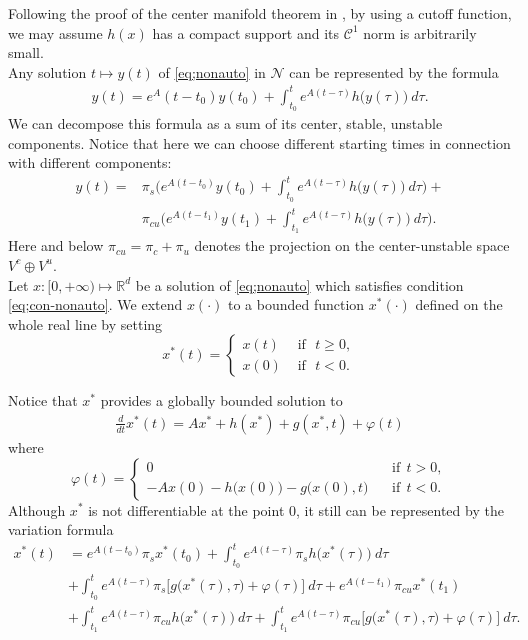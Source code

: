 \documentclass[11pt]{amsart}
\theoremstyle{definition}
\theoremstyle{remark}
\numberwithin{equation}{section}
\begin{document}
Following the proof of the center manifold theorem in \cite{Br03}, by using a cutoff function, we may assume $h(x)$ has a compact support and its $\mathcal{C}^{1}$ norm is arbitrarily small.\\
\indent Any solution $t\mapsto y(t)$ of \eqref{eq;nonauto} in $\mathcal{N}$ can be represented by the formula
\begin{align*}
    y(t)=e^A(t-t_0)y(t_0)+\int^{t}_{t_0}e^{A(t-\tau)}h\big(y(\tau)\big)\ d\tau.
\end{align*}
We can decompose this formula as a sum of its center, stable, unstable components. Notice that here we can choose different starting times in connection with different components:
\begin{equation}
\label{eq;var-decom1}
    \begin{aligned}
        y(t)=&\pi_s\Big(e^{A(t-t_0)}y(t_0)+\int^t_{t_0}e^{A(t-\tau)}h\big(y(\tau)\big)\ d\tau\Big)+\\
    &\pi_{cu}\Big(e^{A(t-t_{1})}y(t_{1})+\int^t_{t_{1}}e^{A(t-\tau)}h\big(y(\tau)\big)\ d\tau\Big).
    \end{aligned}
\end{equation}
Here and below $\pi_{cu}=\pi_c+\pi_u$ denotes the projection on the center-unstable space $V^c\oplus V^u$.\\
\indent Let $x:[0,+\infty)\mapsto\mathbb{R}^d$ be a solution of \eqref{eq;nonauto} which satisfies condition \eqref{eq;con-nonauto}. We extend $x(\cdot)$ to a bounded function $x^*(\cdot)$ defined on the whole real line by setting
$$ x^*(t) = \begin{cases}
x(t) & \text{ if}\ \ \ t \geq 0, \\
x(0) & \text{ if}\ \ \ t < 0.
\end{cases}
$$

Notice that $x^*$ provides a globally bounded solution to
\begin{align*}
    \frac{d}{dt} x^*(t)=Ax^*+h(x^*)+g(x^*,t)+\varphi(t)
\end{align*}
where
$$ 
\varphi(t)= \begin{cases}
0 &\ \ \ \ \text{if}\ \  t>0,\\
      -Ax(0)-h\big(x(0)\big)-g\big(x(0),t\big)&\ \ \ \ \text{if}\ \ t<0.
\end{cases}
$$
Although $x^*$ is not differentiable at the point 0, it still can be represented by the variation formula
\begin{equation}
\label{eq;var-decom2}
    \begin{aligned}
        x^*(t)&=e^{A(t-t_0)}\pi_sx^*(t_0)+\int^t_{t_0}e^{A(t-\tau)}\pi_sh\big(x^*(\tau)\big)\ d\tau\\
   &+\int^t_{t_0}e^{A(t-\tau)}\pi_{s}\Big[g\big(x^*(\tau),\tau\big)+\varphi(\tau)\Big]\ d\tau+e^{A(t-t_1)}\pi_{cu}x^*(t_1)\\
   &+\int^t_{t_1}e^{A(t-\tau)}\pi_{cu}h\big(x^*(\tau)\big)\ d\tau+\int^t_{t_1}e^{A(t-\tau)}\pi_{cu}\Big[g\big(x^*(\tau),\tau\big)+\varphi(\tau)\Big]\ d\tau.
    \end{aligned}
\end{equation}
\end{document}

